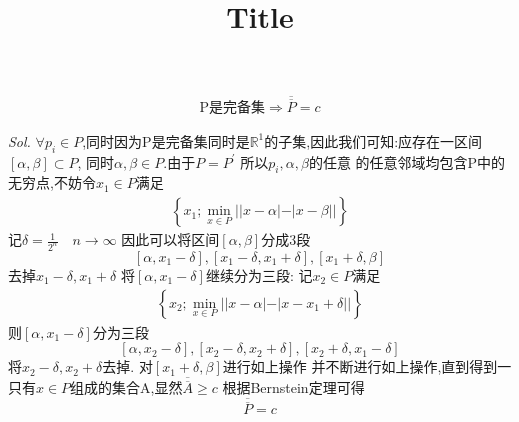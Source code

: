 \documentclass{ctexart}
\title{Title}
\author{}
\theoremstyle{mytheoremstyle}
\theoremstyle{mytheoremstyle}
\theoremstyle{myproblemstyle}
\begin{document}
    \maketitle
    \begin{problem}[课上思考题]
        \begin{align}
            \text{P是完备集} \Rightarrow \overline{\overline{P}} = c
        \end{align}
    \end{problem}
    \textit{ Sol. }
        \(\forall p_i \in P\),同时因为P是完备集同时是\(\mathbb{R}^1\)的子集,因此我们可知:应存在一区间\([\alpha , \beta] \subset P\), 同时\(\alpha,\beta \in P \).由于\(P=P^{'}\) 所以\(p_i,\alpha,\beta\)的任意
        的任意邻域均包含P中的无穷点,不妨令\(x_1 \in P \)满足
        \begin{align}\label{1}
            \left\{x_1;\min\limits_{x\in P}||x-\alpha|-|x-\beta|| \right\}
        \end{align}
        记\(\delta=\frac{1}{2^n} \quad n \rightarrow \infty \)
        因此可以将区间\([\alpha,\beta]\)分成3段\[[\alpha, x_1-\delta] , [x_1-\delta,x_1+\delta],[x_1+\delta,\beta]\]
        去掉\(x_1-\delta,x_1+\delta\)
        将\([\alpha,x_1-\delta]\)继续分为三段: 记\(x_2 \in P\)满足
        \begin{align}\label{2}
            \left\{x_2; \min\limits_{x\in P}||x-\alpha|-|x-x_1+\delta||\right\}
        \end{align}
        则\([\alpha,x_1-\delta]\)分为三段 
        \[[\alpha,x_2-\delta] , [x_2-\delta,x_2+\delta],[x_2+\delta,x_1-\delta]\]
        将\(x_2-\delta,x_2+\delta\)去掉.
        对\([x_1+\delta,\beta]\)进行如上操作
        并不断进行如上操作,直到得到一只有\(x\in P\)组成的集合A,显然\(\overline{\overline{A}} \geq c \) 根据Bernstein定理可得 
        \[\overline{\overline{P}}=c\]
        
\end{document}
